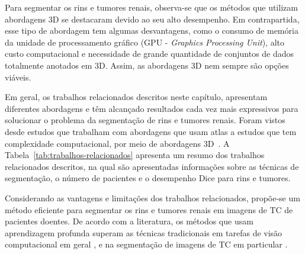 
Para segmentar os rins e tumores renais, observa-se que os métodos que utilizam abordagens 3D se destacaram devido ao seu alto desempenho. Em contrapartida, esse tipo de abordagem tem algumas desvantagens, como o consumo de memória da unidade de processamento gráfico (GPU - \textit{Graphics Processing Unit}), alto custo computacional e necessidade de grande quantidade de conjuntos de dados totalmente anotados em 3D. Assim, as abordagens 3D nem sempre são opções viáveis.

Em geral, os trabalhos relacionados descritos neste capítulo, apresentam diferentes abordagens e têm alcançado resultados cada vez mais expressivos para solucionar o problema da segmentação de rins e tumores renais. Foram vistos desde estudos que trabalham com abordagens que usam atlas \cite{wolz2013automated,yang2014automatic,yang2018automatic} a estudos que tem complexidade computacional, por meio de abordagens 3D~\cite{jackson2018deep,yang2018automatic,Yan9098325,QAYYUM2020104097,ZHAO2020100357,HELLER2021101821,Lin2021,Tanimoto22,YANG2022106616,KANG2022103334}. A Tabela~\ref{tab:trabalhos-relacionados} apresenta um resumo dos trabalhos relacionados descritos, na qual são apresentadas informações sobre as técnicas de segmentação, o número de pacientes e o desempenho Dice para rins e tumores.

Considerando as vantagens e limitações dos trabalhos relacionados, propõe-se um método eficiente para segmentar os rins e tumores renais em imagens de TC de pacientes doentes. De acordo com a literatura, os métodos que usam aprendizagem profunda superam as técnicas tradicionais em tarefas de visão computacional em geral \cite{krizhevsky2012imagenet}, e na segmentação de imagens de TC em particular \cite{christ2017automatic}.

